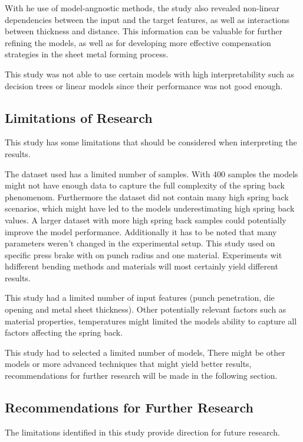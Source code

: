 With he use of model-angnostic methods, the study also revealed non-linear dependencies between the input and the
target features, as well as interactions between thickness and distance.
This information can be valuable for further refining the models, as well as for developing more effective
compensation strategies in the sheet metal forming process.

This study was not able to use certain models with high interpretability such as decision trees or linear models
since their performance was not good enough.

\subsection{Limitations of Research}\label{subsec:limitations-of-research}
This study has some limitations that should be considered when interpreting the results.

The dataset used has a limited number of samples.
With 400 samples the models might not have enough data to capture the full complexity of the spring back phenomenom.
Furthermore the dataset did not contain many high spring back scenarios, which might have led to the models
underestimating high spring back values.
A larger dataset with more high spring back samples could potentially improve the model performance.
Additionally it has to be noted that many parameters weren't changed in the experimental setup.
This study used on specific press brake with on punch radius and one material.
Experiments wit hdifferent bending methods and materials will most certainly yield different results.

This study had a limited number of input features (punch penetration, die opening and
metal sheet thickness).
Other potentially relevant factors such as material properties, temperatures might limited the models ability to
capture all factors affecting the spring back.

This study had to selected a limited number of models,
There might be other models or more advanced techniques that might yield better results, recommendations for further
research will be made in the following section.

\subsection{Recommendations for Further Research}\label{subsec:recommendations-for-further-research}
The limitations identified in this study provide direction for future research.

